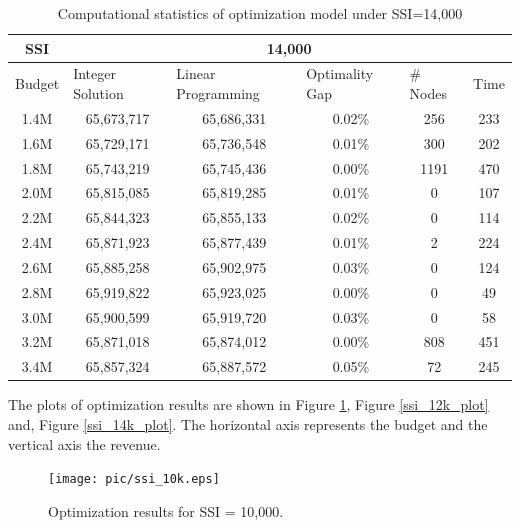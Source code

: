 \documentclass[12pt,english]{report}
\begin{document}
\begin{table}[H]
\centering
\caption{Computational statistics of optimization model under SSI=14,000}
\label{ssi14k}
\begin{tabular}{|c|c|c|c|c|c|}
\hline %
SSI     & \multicolumn{5}{c|}{14,000}                      
\\ \hline
\multicolumn{1}{|l|}{Budget} & \multicolumn{1}{l|}{Integer Solution} &
\multicolumn{1}{l|}{Linear Programming} & \multicolumn{1}{l|}{Optimality Gap} &
\multicolumn{1}{l|}{\# Nodes} & \multicolumn{1}{l|}{Time} \\
\hline
1.4M    & 65,673,717     & 65,686,331 & 0.02\%       & 256    &233                \\ \hline
1.6M   & 65,729,171  & 65,736,548 & 0.01\%   & 300     &202                    \\ \hline
1.8M   & 65,743,219   & 65,745,436 & 0.00\%       & 1191   & 470                \\ \hline
2.0M  & 65,815,085   & 65,819,285 & 0.01\%   & 0  & 107                        \\ \hline
2.2M   & 65,844,323   & 65,855,133 & 0.02\%     & 0  & 114                      \\ \hline
2.4M   & 65,871,923   & 65,877,439 & 0.01\%     & 2   & 224                     \\ \hline
2.6M      & 65,885,258     & 65,902,975 & 0.03\%     & 0       & 124                 \\ \hline
2.8M   & 65,919,822      & 65,923,025 & 0.00\%   & 0      & 49                     \\ \hline
3.0M    & 65,900,599    & 65,919,720 & 0.03\%   & 0    & 58                       \\ \hline
3.2M  & 65,871,018    & 65,874,012 & 0.00\%  & 808    & 451                     \\ \hline
3.4M      & 65,857,324     & 65,887,572 & 0.05\%   & 72    & 245                     \\ \hline
\end{tabular}
\end{table}

The plots of optimization results are shown in Figure \ref{ssi_10k_plot}, Figure \ref{ssi_12k_plot} and, Figure \ref{ssi_14k_plot}. The horizontal axis represents the budget and the vertical axis the revenue. 


\begin{figure}[ht]
    \centering
    \texttt{[image: pic/ssi\_10k.eps]}
    \caption{Optimization results for SSI = 10,000. }
     \label{ssi_10k_plot}
\end{figure}
\end{document}
